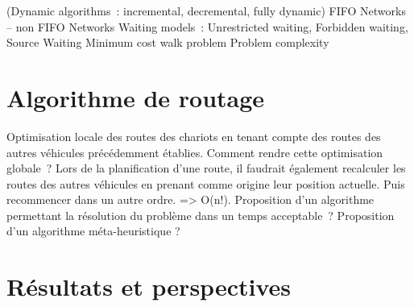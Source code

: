 \documentclass{roadef2011}
\begin{document}
(Dynamic algorithms : incremental, decremental, fully dynamic)
FIFO Networks – non FIFO Networks
Waiting models : Unrestricted waiting, Forbidden waiting, Source Waiting
Minimum cost walk problem
Problem complexity

\section{Algorithme de routage}

Optimisation locale des routes des chariots en tenant compte des routes des autres véhicules précédemment établies.
Comment rendre cette optimisation globale ? Lors de la planification d'une route, il faudrait également recalculer les routes des autres véhicules en prenant comme origine leur position actuelle. Puis recommencer dans un autre ordre. => O(n!). 
Proposition d'un algorithme permettant la résolution du problème dans un temps acceptable ?
Proposition d'un algorithme méta-heuristique ?

	
\section{R\'esultats et perspectives}




\end{document}
